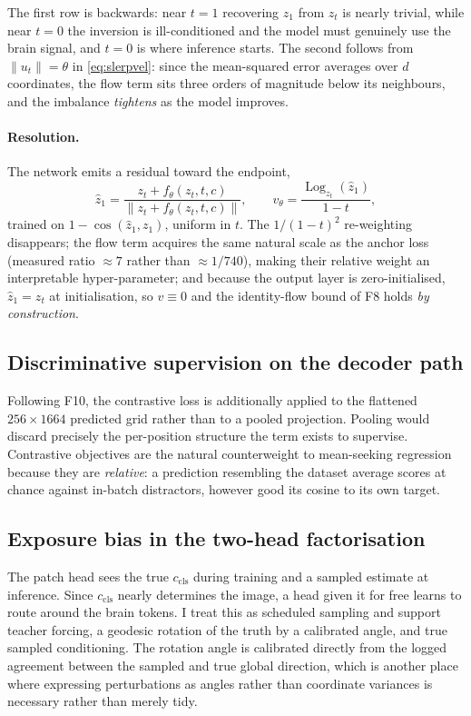 \documentclass[11pt,a4paper]{article}
\newcommand{\Log}{\operatorname{Log}}
\theoremstyle{plain}
\theoremstyle{remark}
\begin{document}
The first row is backwards: near $t\!=\!1$ recovering $z_1$ from $z_t$ is nearly
trivial, while near $t\!=\!0$ the inversion is ill-conditioned and the model must
genuinely use the brain signal, and $t\!=\!0$ is where inference starts. The
second follows from $\lVert u_t\rVert=\theta$ in \eqref{eq:slerpvel}: since the
mean-squared error averages over $d$ coordinates, the flow term sits three orders
of magnitude below its neighbours, and the imbalance \emph{tightens} as the model
improves.

\paragraph{Resolution.} The network emits a residual toward the endpoint,
\begin{equation}
\hat z_1=\frac{z_t+f_\theta(z_t,t,c)}{\lVert z_t+f_\theta(z_t,t,c)\rVert},
\qquad
v_\theta=\frac{\Log_{z_t}(\hat z_1)}{1-t},
\end{equation}
trained on $1-\cos(\hat z_1,z_1)$, uniform in $t$. The $1/(1-t)^2$ re-weighting
disappears; the flow term acquires the same natural scale as the anchor loss
(measured ratio $\approx\!7$ rather than $\approx\!1/740$), making their relative
weight an interpretable hyper-parameter; and because the output layer is
zero-initialised, $\hat z_1 = z_t$ at initialisation, so $v\equiv0$ and the
identity-flow bound of F8 holds \emph{by construction}.

\subsection{Discriminative supervision on the decoder path}
\label{sec:contrastive}

Following F10, the contrastive loss is additionally applied to the flattened
$256\times1664$ predicted grid rather than to a pooled projection. Pooling would
discard precisely the per-position structure the term exists to supervise.
Contrastive objectives are the natural counterweight to mean-seeking regression
because they are \emph{relative}: a prediction resembling the dataset average
scores at chance against in-batch distractors, however good its cosine to its own
target.

\subsection{Exposure bias in the two-head factorisation}

The patch head sees the true $c_{\mathrm{cls}}$ during training and a sampled
estimate at inference. Since $c_{\mathrm{cls}}$ nearly determines the image, a
head given it for free learns to route around the brain tokens. I treat this as
scheduled sampling and support teacher forcing, a geodesic rotation of the truth
by a calibrated angle, and true sampled conditioning. The rotation angle is
calibrated directly from the logged agreement between the sampled and true global
direction, which is another place where expressing perturbations as angles rather
than coordinate variances is necessary rather than merely tidy.
\end{document}
